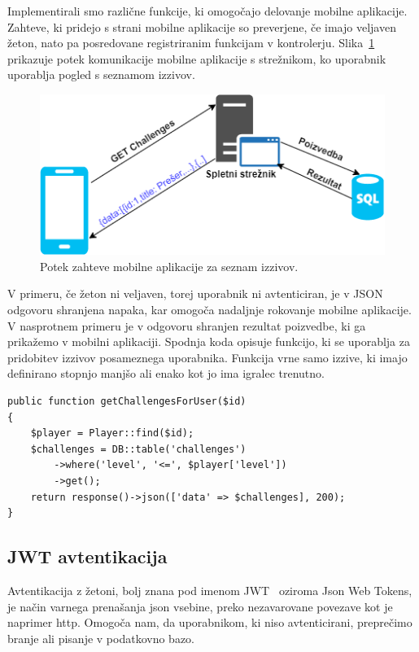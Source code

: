 \documentclass[a4paper, 12pt]{book}
\begin{document}
Implementirali smo različne funkcije, ki omogočajo delovanje mobilne aplikacije. Zahteve, ki pridejo s strani mobilne aplikacije so preverjene, če imajo veljaven žeton, nato pa posredovane registriranim funkcijam v kontrolerju. Slika~\ref{REST_communication} prikazuje potek komunikacije mobilne aplikacije s strežnikom, ko uporabnik uporablja pogled s seznamom izzivov. 
\begin{figure}[H]
\centering
\includegraphics[height=0.35\textwidth]{slike/REST}
\caption{Potek zahteve mobilne aplikacije za seznam izzivov.}\label{REST_communication}
\end{figure}
\noindent V primeru, če žeton ni veljaven, torej uporabnik ni avtenticiran, je v JSON odgovoru shranjena napaka, kar omogoča nadaljnje rokovanje mobilne aplikacije. V nasprotnem primeru je v odgovoru shranjen rezultat poizvedbe, ki ga prikažemo v mobilni aplikaciji. Spodnja koda opisuje funkcijo, ki se uporablja za pridobitev izzivov posameznega uporabnika. Funkcija vrne samo izzive, ki imajo definirano stopnjo manjšo ali enako kot jo ima igralec trenutno.
\bigskip
\begin{lstlisting}
public function getChallengesForUser($id)
{
    $player = Player::find($id);
    $challenges = DB::table('challenges')
        ->where('level', '<=', $player['level'])
        ->get();
    return response()->json(['data' => $challenges], 200);
}
\end{lstlisting}
\subsection{JWT avtentikacija}
\label{6:jwt}
Avtentikacija z žetoni, bolj znana pod imenom JWT~\cite{jwt} oziroma Json Web Tokens, je način varnega prenašanja json vsebine, preko nezavarovane povezave kot je naprimer http. Omogoča nam, da uporabnikom, ki niso avtenticirani, preprečimo branje ali pisanje v podatkovno bazo.
\end{document}
